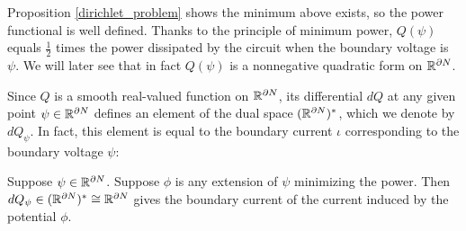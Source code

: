 Proposition \ref{dirichlet_problem} shows the minimum above exists, so the power functional is well defined.  Thanks to the principle of minimum power, $Q(\psi)$ equals $\frac{1}{2}$ times the power dissipated by the circuit when the boundary voltage is $\psi$.  We will later see that in fact $Q(\psi)$ is a nonnegative quadratic form on ${\mathbb{R}}^{\partial N}$. 

Since $Q$ is a smooth real-valued function on ${\mathbb{R}}^{\partial N}$, its differential $d Q$ at any given point $\psi \in {\mathbb{R}}^{\partial N}$ defines an element of the dual space $({\mathbb{R}}^{\partial N})^\ast$, which we denote by $d Q_\psi$.  In fact, this element is equal to the boundary current $\iota$ corresponding to the boundary voltage $\psi$:

\begin{proposition} \label{boundary_current_determines_boundary_voltage}
Suppose $\psi \in {\mathbb{R}}^{\partial N}$.  Suppose $\phi$ is any extension of $\psi$ minimizing the power. Then $dQ_\psi \in ({\mathbb{R}}^{\partial N})^\ast \cong {\mathbb{R}}^{\partial N}$ gives the boundary current of the current induced by the potential $\phi$.
\end{proposition}

